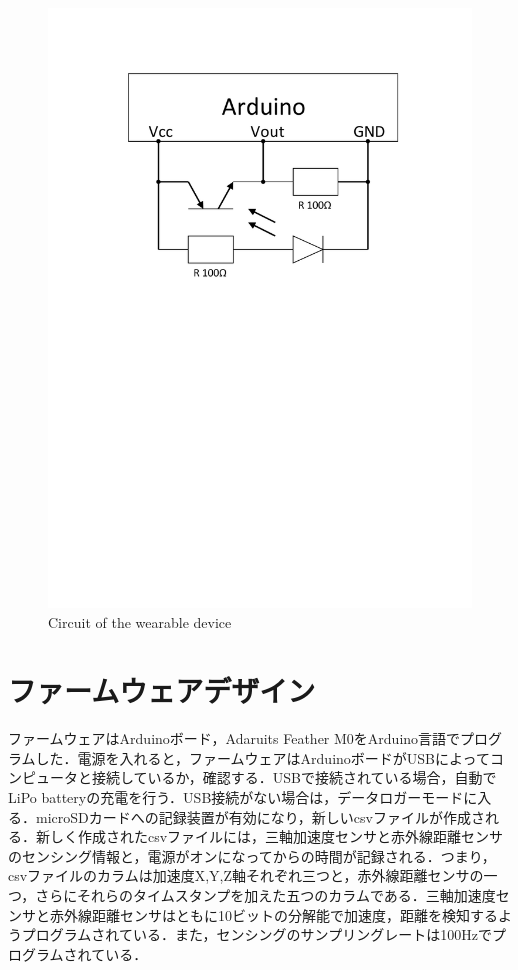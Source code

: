 \begin{figure}[H]
  \centering
  \includegraphics[width=0.5\linewidth]{fig/test}
  \caption{Circuit of the wearable device}
  \label{fig:circuit}{}
\end{figure}


\section{ファームウェアデザイン}
ファームウェアはArduinoボード，Adaruits Feather M0をArduino言語でプログラムした．電源を入れると，ファームウェアはArduinoボードがUSBによってコンピュータと接続しているか，確認する．USBで接続されている場合，自動でLiPo batteryの充電を行う．USB接続がない場合は，データロガーモードに入る．microSDカードへの記録装置が有効になり，新しいcsvファイルが作成される．新しく作成されたcsvファイルには，三軸加速度センサと赤外線距離センサのセンシング情報と，電源がオンになってからの時間が記録される．つまり，csvファイルのカラムは加速度X,Y,Z軸それぞれ三つと，赤外線距離センサの一つ，さらにそれらのタイムスタンプを加えた五つのカラムである．三軸加速度センサと赤外線距離センサはともに10ビットの分解能で加速度，距離を検知するようプログラムされている．また，センシングのサンプリングレートは100Hzでプログラムされている．

